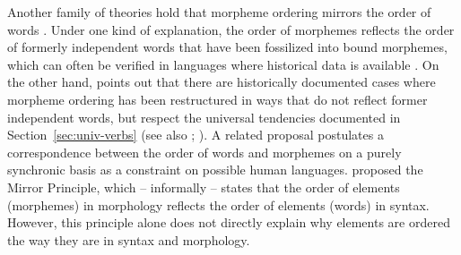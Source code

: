\documentclass[11pt,letterpaper]{article}
\newcommand{\citep}{\parencite}
\newcommand{\citet}{\Textcite}
\newcommand\mhahn[1]{{\color{red}(#1)}}
\begin{document}









Another family of theories hold that morpheme ordering mirrors the order of words \citep{givon1971historical,venneman1973explanation,baker1985the}.
Under one kind of explanation, the order of morphemes reflects the order of formerly independent words that have been fossilized into bound morphemes, which can often be verified in languages where historical data is available \citep{givon1971historical,venneman1973explanation}.
On the other hand, \citet{bybee-morphology-1985} points out that there are historically documented cases where morpheme ordering has been restructured in ways that do not reflect former independent words, but respect the universal tendencies documented in Section~\ref{sec:univ-verbs} (see also \citet{mithun2000the, haspelmath1993the, mithun1995affixation}; \citet[Section 15]{rice2000morpheme}).
A related proposal postulates a correspondence between the order of words and morphemes on a purely synchronic basis as a constraint on possible human languages.
\citep{baker1985the} proposed the Mirror Principle, which -- informally -- states that the order of elements (morphemes) in morphology reflects the order of elements (words) in syntax.
However, this principle alone does not directly explain why elements are ordered the way they are in syntax and morphology.
\end{document}
